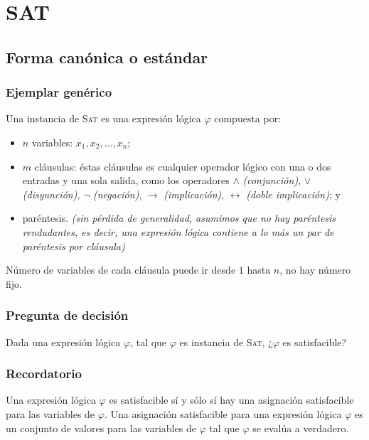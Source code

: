 \documentclass[a4paper]{article}
\begin{document}


\section{SAT}
\subsection{Forma canónica o estándar}
\subsubsection{Ejemplar genérico}
\noindent
Una instancia de \textsc{Sat} es una expresión lógica \(\varphi\) compuesta por:
\begin{itemize}
    \item \(n\) variables: \(x_{1}, x_{2}, \dotsc, x_{n}\);
    \item \(m\) cláusulas: éstas cláusulas es cualquier operador lógico con una o dos entradas y una sola salida, 
    como los operadores \(\land\) \textit{(conjunción)}, \(\lor\) \textit{(disyunción)}, \(\neg\) \textit{(negación)},
    \(\longrightarrow\) \textit{(implicación)}, \(\longleftrightarrow\) \textit{(doble implicación)}; y
    \item paréntesis. \textit{(sin pérdida de generalidad, asumimos que no hay paréntesis rendudantes, es decir, una 
    expresión lógica contiene a lo más un par de paréntesis por cláusula)}
\end{itemize}
Número de variables de cada cláusula puede ir desde \(1\) hasta \(n\), no hay número fijo. 
\subsubsection{Pregunta de decisión}
\noindent
Dada una expresión lógica \(\varphi\), tal que \(\varphi\) es instancia de \textsc{Sat}, ¿\(\varphi\) es satisfacible?
\subsubsection{Recordatorio}
\noindent
Una expresión lógica \(\varphi\) es satisfacible sí y sólo sí hay una asignación satisfacible para las variables de \(\varphi\).
\newline 
Una asignación satisfacible para una expresión lógica \(\varphi\) es un conjunto de valores para las variables de \(\varphi\) tal que 
\(\varphi\) se evalúa a verdadero.
\end{document}
